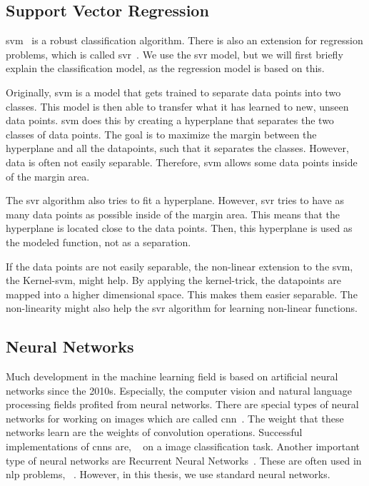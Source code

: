 \subsection{Support Vector Regression}
\label{sec:bg:svm}
\ac{svm}~\cite{cortes1995support} is a robust classification algorithm.
There is also an extension for regression problems, which is called \ac{svr}~\cite{drucker1997support}.
We use the \ac{svr} model, but we will first briefly explain the classification model, as the regression model is based on this.

Originally, \ac{svm} is a model that gets trained to separate data points into two classes.
This model is then able to transfer what it has learned to new, unseen data points.
\ac{svm} does this by creating a hyperplane that separates the two classes of data points.
The goal is to maximize the margin between the hyperplane and all the datapoints, such that it separates the classes.
However, data is often not easily separable.
Therefore, \ac{svm} allows some data points inside of the margin area.

The \ac{svr} algorithm also tries to fit a hyperplane.
However, \ac{svr} tries to have as many data points as possible inside of the margin area.
This means that the hyperplane is located close to the data points.
Then, this hyperplane is used as the modeled function, not as a separation.

If the data points are not easily separable, the non-linear extension to the \ac{svm}, the Kernel-\ac{svm}, might help.
By applying the kernel-trick, the datapoints are mapped into a higher dimensional space.
This makes them easier separable.
The non-linearity might also help the \ac{svr} algorithm for learning non-linear functions.

\subsection{Neural Networks}
\label{sec:bg:nn}
Much development in the machine learning field is based on artificial neural networks since the 2010s.
Especially, the computer vision and natural language processing fields profited from neural networks.
There are special types of neural networks for working on images which are called \ac{cnn}~\cite{lecun1998gradient}.
The weight that these networks learn are the weights of convolution operations.
Successful implementations of \acp{cnn} are, \eg~\cite{krizhevsky2012imagenet,he2016deep} on a image classification task.
Another important type of neural networks are Recurrent Neural Networks~\cite{rumelhart1985learning}.
These are often used in \ac{nlp} problems, \eg~\cite{graves2013speech,socher2013recursive}.
However, in this thesis, we use standard neural networks.

